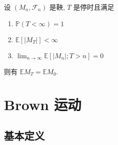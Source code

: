\documentclass[10pt]{yerbaformat}
\begin{document}
\begin{theorem}[停止定理]
    设 $\left(M_{n}, \mathcal{F}_{n}\right)$ 是鞅, $T$ 是停时且满足
    \begin{enumerate}
        \item $\mathbb{P}(T<\infty)=1$
        \item $\mathbb{E}\left[\left|M_{T}\right|\right]<\infty$
        \item $\lim _{n \rightarrow \infty} \mathbb{E}\left[\left|M_{n}\right| ; T>n\right]=0$
    \end{enumerate}
    则有 $\mathbb{E} M_{T}=\mathbb{E} M_{0}$.
\end{theorem}

\section{Brown 运动}
\subsection{基本定义}

\begin{definition}
    
\end{definition}
\end{document}
